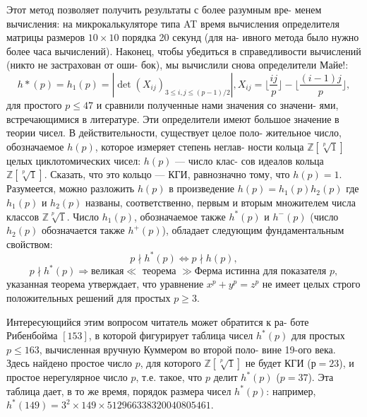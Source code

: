 Этот метод позволяет получить результаты с более разумным вре- \linebreak менем вычисления: на микрокалькуляторе типа AT время вычисления \linebreak определителя матрицы размеров $10 \times 10$ порядка 20 секунд (для на- \linebreak ивного метода было нужно более часа вычислений). Наконец, чтобы \linebreak убедиться в справедливости вычислений (никто не застрахован от оши-\linebreak
\noindent бок), мы вычислили снова определители Майе!:  
$$h*(p)=h_1(p)=|\det (X_{ij})_{3 \le i, j \le (p-1)/2}|, X_{ij}=\lfloor{\frac{ij}{p}}\rfloor - \lfloor{\frac{(i-1)j}{p}}\rfloor,$$
для простого $p \le 47$ и сравнили полученные нами значения со значени- \linebreak ями, встречающимися в литературе. Эти определители имеют большое \linebreak значение в теории чисел. В действительности, существует целое поло- \linebreak жительное число, обозначаемое $h(p)$, которое измеряет степень неглав- \linebreak ности кольца $\mathbb{Z}[\sqrt[p]{1}]$ целых циклотомических чисел: $h(p)$ — число клас- \linebreak сов идеалов кольца $\mathbb{Z}[\sqrt[p]{1}]$. Сказать, что это кольцо — КГИ, равнозначно \linebreak тому, что $h(p) = 1$. Разумеется, можно разложить $h(p)$ в произведение \linebreak $h(p) = h_1(p)h_2(p)$ где $h_1(p)$ и $h_2(p)$ названы, соответственно, первым \linebreak и вторым множителем числа классов $\mathbb{Z}\sqrt[p]{1}$. Число $h_1(p)$, обозначаемое \linebreak также $h^*(p)$ и $h^-(p)$ (число $h_2(p)$ обозначается также $h^+(p)$), обладает \linebreak следующим фундаментальным свойством:
$$p \nmid h^*(p)\Longleftrightarrow p \nmid h(p),$$
$$p \nmid h^*(p) \Rightarrow \text{великая} \ll \text{ теорема } \gg \text{Ферма истинна для показателя } p,$$
указанная теорема утверждает, что уравнение $x^p + y^p = z^p$ не имеет \linebreak целых строго положительных решений для простых $p \ge 3$.
  
Интересующийся этим вопросом читатель может обратится к ра- \linebreak боте Рибенбойма $[153]$, в которой фигурирует таблица чисел $h^*(p)$ для \linebreak простых $p \le 163$, вычисленная вручную Куммером во второй поло- \linebreak вине 19-ого века. Здесь найдено простое число $p$, для которого $\mathbb{Z}[\sqrt[p]{1}]$ не \linebreak будет КГИ ($р = 23$), и простое нерегулярное число $p$, т.е. такое, что $p$ \linebreak делит $h^*(p)$ ($p = 37$). Эта таблица дает, в то же время, порядок размера \linebreak чисел $h^*(p)$: например, $h^*(149) = 3^2 \times 149 \times 512966338320040805461$.
